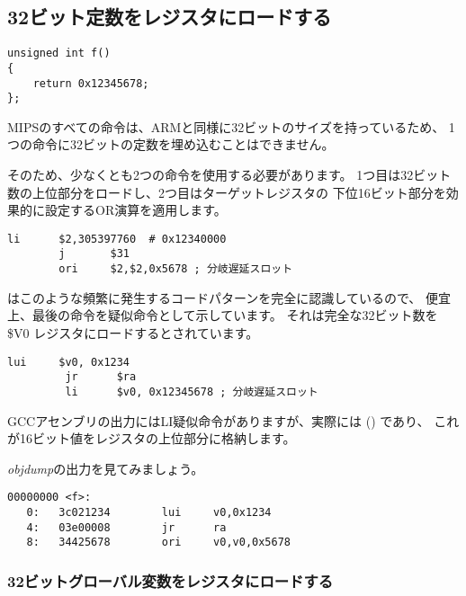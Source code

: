 ﻿\subsection{32ビット定数をレジスタにロードする}
\label{MIPS_big_constants}

\begin{lstlisting}[style=customc]
unsigned int f()
{
	return 0x12345678;
};
\end{lstlisting}

MIPSのすべての命令は、ARMと同様に32ビットのサイズを持っているため、
1つの命令に32ビットの定数を埋め込むことはできません。

そのため、少なくとも2つの命令を使用する必要があります。
1つ目は32ビット数の上位部分をロードし、2つ目はターゲットレジスタの
下位16ビット部分を効果的に設定するOR演算を適用します。

\begin{lstlisting}[caption=GCC 4.4.5 -O3 (\assemblyOutput),style=customasmMIPS]
        li      $2,305397760  # 0x12340000
        j       $31
        ori     $2,$2,0x5678 ; 分岐遅延スロット
\end{lstlisting}

\IDA はこのような頻繁に発生するコードパターンを完全に認識しているので、
便宜上、最後の命令を疑似命令として示しています。
それは完全な32ビット数を \$V0 レジスタにロードするとされています。


\begin{lstlisting}[caption=GCC 4.4.5 -O3 (IDA),style=customasmMIPS]
         lui     $v0, 0x1234
         jr      $ra
         li      $v0, 0x12345678 ; 分岐遅延スロット
\end{lstlisting}

GCCアセンブリの出力にはLI疑似命令がありますが、実際には () であり、
これが16ビット値をレジスタの上位部分に格納します。

\emph{objdump}の出力を見てみましょう。

\begin{lstlisting}[caption=objdump,style=customasmMIPS]
00000000 <f>:
   0:   3c021234        lui     v0,0x1234
   4:   03e00008        jr      ra
   8:   34425678        ori     v0,v0,0x5678
\end{lstlisting}

\subsubsection{32ビットグローバル変数をレジスタにロードする}

